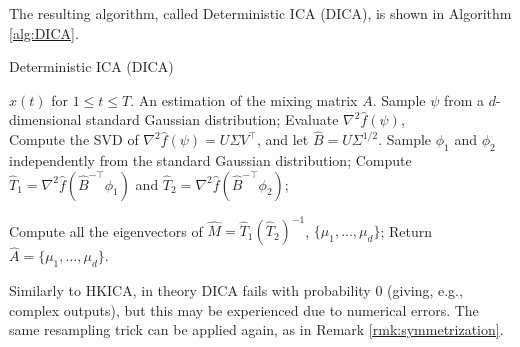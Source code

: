 \documentclass[twoside,11pt]{article}
\newcommand{\Epsi}{\mathcal{E}_{\psi}}
\newcommand{\Ephi}{\mathcal{E}_{\phi}}
\newcommand{\cN}{\cal{N}}
\begin{document}
The resulting algorithm, called Deterministic ICA (DICA), is shown in Algorithm \ref{alg:DICA}. 
\begin{algorithm}
\caption{Deterministic ICA (DICA)}
\label{alg:DICA}
\begin{algorithmic}[1]
\INPUT $x(t)$ for $1\le t \le T$. 
\OUTPUT An estimation of the mixing matrix $A$. 
\STATE Sample $\psi$ from a $d$-dimensional standard Gaussian distribution;
\STATE Evaluate $\nabla^2\hat{f}(\psi)$, \\
\STATE Compute the SVD of $\nabla^2\hat{f}(\psi) = U \Sigma V^{\top}$, and let $\hat{B} =  U \Sigma^{1/2}$.
\STATE Sample $\phi_1$ and $\phi_2$ independently from the standard Gaussian distribution;
\STATE Compute $\hat{T}_1 =\nabla^2\hat{f}(\hat{B}^{-\top}\phi_1)$ and  $\hat{T}_2 =\nabla^2\hat{f}(\hat{B}^{-\top}\phi_2)$;

\STATE Compute all the eigenvectors of $\hat{M} = \hat{T}_1\left(\hat{T}_2\right)^{-1}$, $\{\mu_1,\ldots,\mu_d\}$;
\STATE Return $\hat{A} = \{\mu_1,\ldots,\mu_d\}$.
\end{algorithmic}
\end{algorithm}
\begin{remark}
Similarly to HKICA, in theory DICA fails with probability 0 (giving, e.g., complex outputs), but this may be experienced due to numerical errors.
The same resampling trick can be applied again, as in Remark \ref{rmk:symmetrization}. 
\end{remark}
\end{document}
